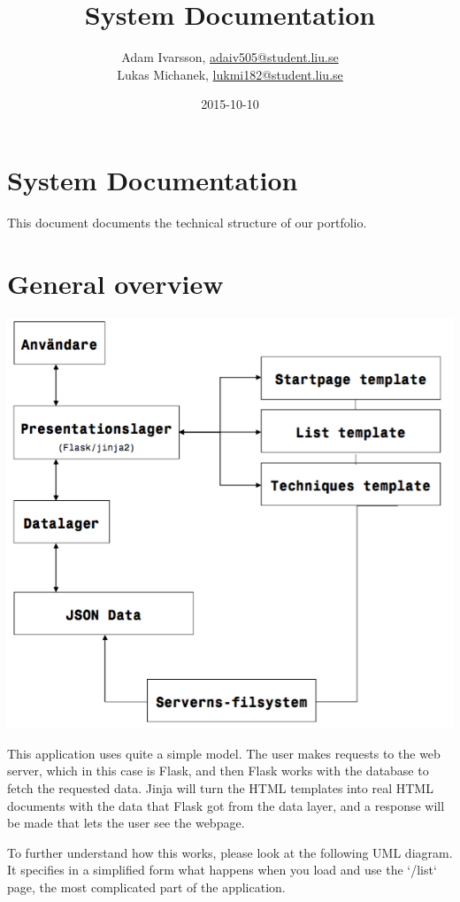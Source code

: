 \documentclass{TDP003mall}
\author{Adam Ivarsson, \url{adaiv505@student.liu.se}\\
  Lukas Michanek, \url{lukmi182@student.liu.se}}
\title{System Documentation}
\date{2015-10-10}
\begin{document}
\projectpage

\section{System Documentation}\label{system-documentation}

This document documents the technical structure of our portfolio.

\section{General overview}\label{general-overview}

\centerline{\includegraphics[scale=0.5]{graph_1}}

This application uses quite a simple model. The user makes requests to the web server, which in this case is Flask, and then Flask works with the database to fetch the requested data. Jinja will turn the HTML templates into real HTML documents with the data that Flask got from the data layer, and a response will be made that lets the user see the webpage.

To further understand how this works, please look at the following UML diagram. It specifies in a simplified form what happens when you load and use the `/list` page, the most complicated part of the application.
\end{document}
